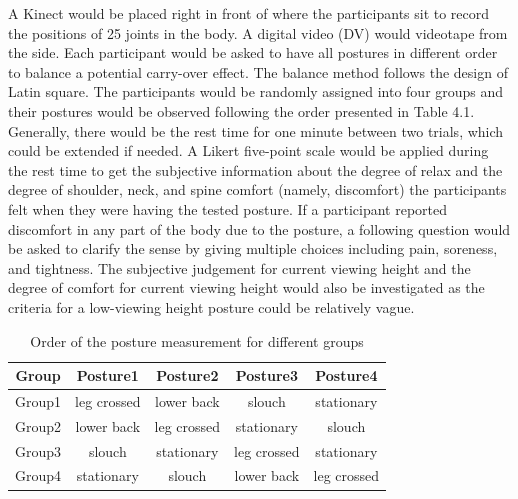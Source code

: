 A Kinect would be placed right in front of where the participants sit to record the positions of 25 joints in the body. A digital video (DV) would videotape from the side. Each participant would be asked to have all postures in different order to balance a potential carry-over effect. The balance method follows the design of Latin square. The participants would be randomly assigned into four groups and their postures would be observed following the order presented in Table 4.1. Generally, there would be the rest time for one minute between two trials, which could be extended if needed. A Likert five-point scale would be applied during the rest time to get the subjective information about the degree of relax and the degree of shoulder, neck, and spine comfort (namely, discomfort) the participants felt when they were having the tested posture. If a participant reported discomfort in any part of the body due to the posture, a following question would be asked to clarify the sense by giving multiple choices including pain, soreness, and tightness. The subjective judgement for current viewing height and the degree of comfort for current viewing height would also be investigated as the criteria for a low-viewing height posture could be relatively vague. 

\begin{table}[ht]
\centering
\begin{tabular}{c c c c c}
Group&Posture1&Posture2&Posture3&Posture4 \\
\hline
Group1&leg crossed&lower back&slouch&stationary \\
Group2&lower back&leg crossed&stationary&slouch \\
Group3&slouch&stationary&leg crossed&stationary \\
Group4&stationary&slouch&lower back&leg crossed \\ [1ex]
\hline
\end{tabular}
\label{table:nonlin}
\caption{Order of the posture measurement for different groups}
\end{table}

